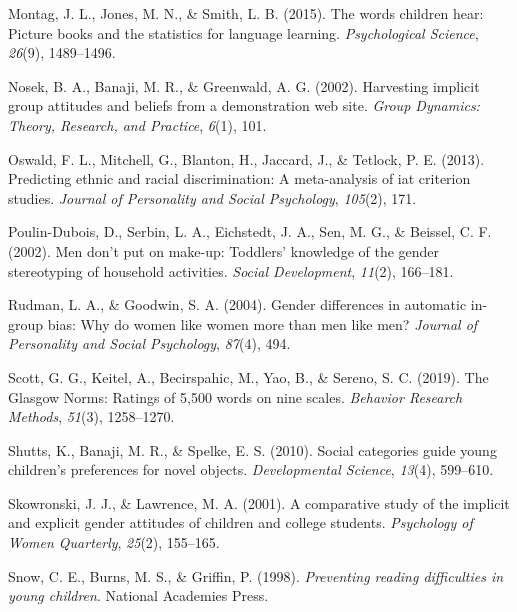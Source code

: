 \documentclass[
  english,
  ,man,floatsintext]{apa6}
\begin{document}
\leavevmode\hypertarget{ref-montag2015words}{}%
Montag, J. L., Jones, M. N., \& Smith, L. B. (2015). The words children hear: Picture books and the statistics for language learning. \emph{Psychological Science}, \emph{26}(9), 1489--1496.

\leavevmode\hypertarget{ref-nosek2002harvesting}{}%
Nosek, B. A., Banaji, M. R., \& Greenwald, A. G. (2002). Harvesting implicit group attitudes and beliefs from a demonstration web site. \emph{Group Dynamics: Theory, Research, and Practice}, \emph{6}(1), 101.

\leavevmode\hypertarget{ref-oswald2013predicting}{}%
Oswald, F. L., Mitchell, G., Blanton, H., Jaccard, J., \& Tetlock, P. E. (2013). Predicting ethnic and racial discrimination: A meta-analysis of iat criterion studies. \emph{Journal of Personality and Social Psychology}, \emph{105}(2), 171.

\leavevmode\hypertarget{ref-poulin2002men}{}%
Poulin-Dubois, D., Serbin, L. A., Eichstedt, J. A., Sen, M. G., \& Beissel, C. F. (2002). Men don't put on make-up: Toddlers' knowledge of the gender stereotyping of household activities. \emph{Social Development}, \emph{11}(2), 166--181.

\leavevmode\hypertarget{ref-rudman2004gender}{}%
Rudman, L. A., \& Goodwin, S. A. (2004). Gender differences in automatic in-group bias: Why do women like women more than men like men? \emph{Journal of Personality and Social Psychology}, \emph{87}(4), 494.

\leavevmode\hypertarget{ref-scott2019glasgow}{}%
Scott, G. G., Keitel, A., Becirspahic, M., Yao, B., \& Sereno, S. C. (2019). The Glasgow Norms: Ratings of 5,500 words on nine scales. \emph{Behavior Research Methods}, \emph{51}(3), 1258--1270.

\leavevmode\hypertarget{ref-shutts2010social}{}%
Shutts, K., Banaji, M. R., \& Spelke, E. S. (2010). Social categories guide young children's preferences for novel objects. \emph{Developmental Science}, \emph{13}(4), 599--610.

\leavevmode\hypertarget{ref-skowronski2001comparative}{}%
Skowronski, J. J., \& Lawrence, M. A. (2001). A comparative study of the implicit and explicit gender attitudes of children and college students. \emph{Psychology of Women Quarterly}, \emph{25}(2), 155--165.

\leavevmode\hypertarget{ref-snow1998preventing}{}%
Snow, C. E., Burns, M. S., \& Griffin, P. (1998). \emph{Preventing reading difficulties in young children}. National Academies Press.
\end{document}
